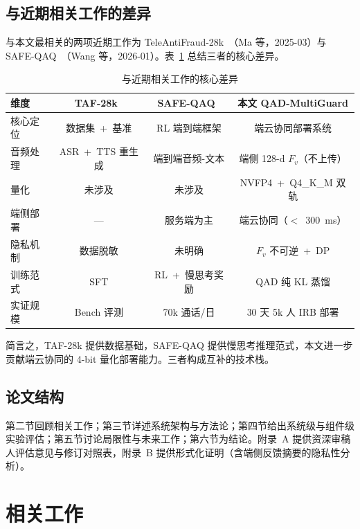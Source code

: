 \documentclass[UTF8,a4paper,10pt,twocolumn]{ctexart}
\theoremstyle{plain}
\newcommand{\QAD}{QAD-MultiGuard}
\begin{document}
\subsection{与近期相关工作的差异}

与本文最相关的两项近期工作为 TeleAntiFraud-28k~\cite{ma2025teleantifraud}（Ma 等，2025-03）与 SAFE-QAQ~\cite{wang2026safe}（Wang 等，2026-01）。表~\ref{tab:comparison} 总结三者的核心差异。

\begin{table}[H]
\centering
\caption{与近期相关工作的核心差异}
\label{tab:comparison}
\small
\begin{tabular}{lccc}
\toprule
维度 & TAF-28k~\cite{ma2025teleantifraud} & SAFE-QAQ~\cite{wang2026safe} & 本文 \QAD{} \\
\midrule
核心定位 & 数据集~+~基准 & RL 端到端框架 & 端云协同部署系统 \\
音频处理 & ASR~+~TTS 重生成 & 端到端音频-文本 & 端侧 128-d $F_v$（不上传） \\
量化 & 未涉及 & 未涉及 & NVFP4~+~Q4\_K\_M 双轨 \\
端侧部署 & --- & 服务端为主 & 端云协同（$<$~300~ms） \\
隐私机制 & 数据脱敏 & 未明确 & $F_v$ 不可逆~+~DP \\
训练范式 & SFT & RL~+~慢思考奖励 & QAD 纯 KL 蒸馏 \\
实证规模 & Bench 评测 & 70k 通话/日 & 30 天 5k 人 IRB 部署 \\
\bottomrule
\end{tabular}
\end{table}

简言之，TAF-28k 提供数据基础，SAFE-QAQ 提供慢思考推理范式，本文进一步贡献端云协同的 4-bit 量化部署能力。三者构成互补的技术栈。

\subsection{论文结构}

第二节回顾相关工作；第三节详述系统架构与方法论；第四节给出系统级与组件级实验评估；第五节讨论局限性与未来工作；第六节为结论。附录~A 提供资深审稿人评估意见与修订对照表，附录~B 提供形式化证明（含端侧反馈摘要的隐私性分析）。

\section{相关工作}
\end{document}
